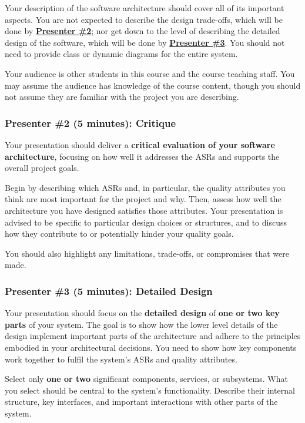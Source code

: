 \documentclass{csse4400}
\begin{document}
Your description of the software architecture should cover all of its important aspects.
You are not expected to describe the design trade-offs,
which will be done by \hyperref[sec:Critique]{\textbf{Presenter \#2}};
nor get down to the level of describing the detailed design of the software,
which will be done by \hyperref[sec:DetailedDesign]{\textbf{Presenter \#3}}.
You should not need to provide class or dynamic diagrams for the entire system.

Your audience is other students in this course and the course teaching staff.
You may assume the audience has knowledge of the course content,
though you should not assume they are familiar with the project you are describing.

\subsubsection{Presenter \#2 (5 minutes): Critique}\label{sec:Critique}

Your presentation should deliver a \textbf{critical evaluation of your software architecture},
focusing on how well it addresses the ASRs and supports the overall project goals.

Begin by describing which ASRs and, in particular,
the quality attributes you think are most important for the project and why.
Then, assess how well the architecture you have designed satisfies those attributes.
Your presentation is advised to be specific to particular design choices or structures,
and to discuss how they contribute to or potentially hinder your quality goals.

You should also highlight any limitations, trade-offs, or compromises that were made.

\subsubsection{Presenter \#3 (5 minutes): Detailed Design}\label{sec:DetailedDesign}

Your presentation should focus on the \textbf{detailed design} of \textbf{one or two key parts} of your system.
The goal is to show how the lower level details of the design implement important parts of the architecture
and adhere to the principles embodied in your architectural decisions.
You need to show how key components work together to fulfil the system's ASRs and quality attributes.

Select only \textbf{one or two} significant components, services, or subsystems.
What you select should be central to the system's functionality. Describe their internal structure, key interfaces,
and important interactions with other parts of the system.
\end{document}
